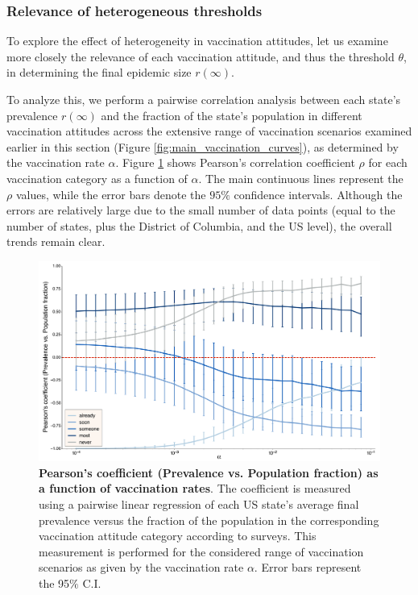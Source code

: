 \documentclass[
 reprint,
 amsmath,amssymb,
 aps,
]{revtex4-2}
\begin{document}
\subsubsection{Relevance of heterogeneous thresholds}

To explore the effect of heterogeneity in vaccination attitudes, let us examine more closely the relevance of each vaccination attitude, and thus the threshold $\theta$, in determining the final epidemic size $r(\infty)$.

To analyze this, we perform a pairwise correlation analysis between each state's prevalence $r(\infty)$ and the fraction of the state's population in different vaccination attitudes across the extensive range of vaccination scenarios examined earlier in this section (Figure \ref{fig:main_vaccination_curves}), as determined by the vaccination rate $\alpha$. Figure \ref{fig:main_correlation_curves} shows Pearson's correlation coefficient $\rho$ for each vaccination category as a function of $\alpha$. The main continuous lines represent the $\rho$ values, while the error bars denote the $95\%$ confidence intervals. Although the errors are relatively large due to the small number of data points (equal to the number of states, plus the District of Columbia, and the US level), the overall trends remain clear.

\begin{figure}
\centering
\includegraphics[width=\textwidth]{figure4.pdf}
\caption{\label{fig:main_correlation_curves} \textbf{Pearson's coefficient (Prevalence vs. Population fraction) as a function of vaccination rates}. The coefficient is measured using a pairwise linear regression of each US state's average final prevalence versus the fraction of the population in the corresponding vaccination attitude category according to surveys. This measurement is performed for the considered range of vaccination scenarios as given by the vaccination rate $\alpha$. Error bars represent the 95$\%$ C.I.}
\end{figure}
\end{document}
